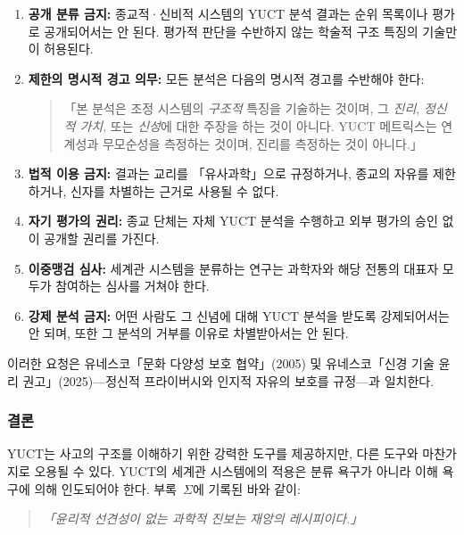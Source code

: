 \documentclass[11pt,a4paper]{article}
\begin{document}
	\begin{enumerate}[label=(\arabic*)]
		\item \textbf{공개 분류 금지:} 종교적·신비적 시스템의 YUCT 분석 결과는 순위 목록이나 평가로 공개되어서는 안 된다. 평가적 판단을 수반하지 않는 학술적 구조 특징의 기술만이 허용된다.
		
		\item \textbf{제한의 명시적 경고 의무:} 모든 분석은 다음의 명시적 경고를 수반해야 한다:
		\begin{quote}
			「본 분석은 조정 시스템의 \emph{구조적} 특징을 기술하는 것이며, 그 \emph{진리}, \emph{정신적 가치}, 또는 \emph{신성}에 대한 주장을 하는 것이 아니다. YUCT 메트릭스는 연계성과 무모순성을 측정하는 것이며, 진리를 측정하는 것이 아니다.」
		\end{quote}
		
		\item \textbf{법적 이용 금지:} 결과는 교리를 「유사과학」으로 규정하거나, 종교의 자유를 제한하거나, 신자를 차별하는 근거로 사용될 수 없다.
		
		\item \textbf{자기 평가의 권리:} 종교 단체는 자체 YUCT 분석을 수행하고 외부 평가의 승인 없이 공개할 권리를 가진다.
		
		\item \textbf{이중맹검 심사:} 세계관 시스템을 분류하는 연구는 과학자와 해당 전통의 대표자 모두가 참여하는 심사를 거쳐야 한다.
		
		\item \textbf{강제 분석 금지:} 어떤 사람도 그 신념에 대해 YUCT 분석을 받도록 강제되어서는 안 되며, 또한 그 분석의 거부를 이유로 차별받아서는 안 된다.
	\end{enumerate}
	
	이러한 요청은 유네스코「문화 다양성 보호 협약」(2005) 및 유네스코「신경 기술 윤리 권고」(2025)—정신적 프라이버시와 인지적 자유의 보호를 규정—과 일치한다.
	
	\subsubsection{결론}
	
	YUCT는 사고의 구조를 이해하기 위한 강력한 도구를 제공하지만, 다른 도구와 마찬가지로 오용될 수 있다. YUCT의 세계관 시스템에의 적용은 분류 욕구가 아니라 이해 욕구에 의해 인도되어야 한다. 부록~$\Sigma$에 기록된 바와 같이:
	
	\begin{quote}
		\itshape
		「윤리적 선견성이 없는 과학적 진보는 재앙의 레시피이다.」
	\end{quote}
	
\end{document}
